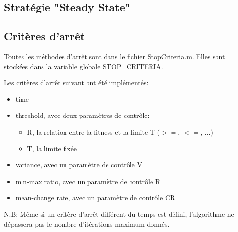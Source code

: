 \documentclass[12pt, letterpaper]{article}
\begin{document}
\subsection{Stratégie "Steady State" }

\subsection{Critères d'arrêt}

Toutes les méthodes d'arrêt sont dans le fichier StopCriteria.m.
Elles sont stockées dans la variable globale STOP\_CRITERIA.

Les critères d'arrêt suivant ont été implémentés:
\begin{itemize}
\item time\\
  
\item threshold, avec deux paramètres de contrôle:
  \begin{itemize}
  \item R, la relation entre la fitness et la limite T ($>=$, $<=$,
    ...)\\
    
  \item T, la limite fixée\\
  \end{itemize}
	
\item variance, avec un paramètre de contrôle V\\
	
\item min-max ratio, avec un paramètre de contrôle R\\
	
\item mean-change rate, avec un paramètre de contrôle CR\\
\end{itemize}

N.B: Même si un critère d'arrêt différent du temps est défini,
l'algorithme ne dépassera pas le nombre d'itérations maximum donnés.
\end{document}
